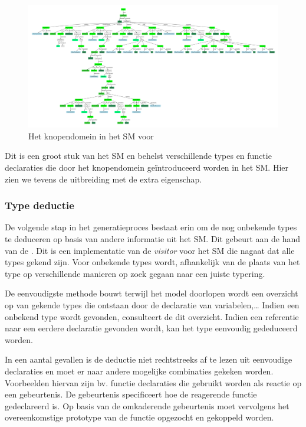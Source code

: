 \begin{figure}[H]
  \centering
  \includegraphics[angle=90,width=0.7\linewidth]{resources/nodes_sm.pdf}
  \caption{Het knopendomein in het SM voor  }
  \label{fig:nodes.sm}
\end{figure}

Dit is een groot stuk van het SM en behelst verschillende types en functie
declaraties die door het knopendomein ge\"introduceerd worden in het SM. Hier
zien we tevens de uitbreiding met de extra  eigenschap.

\subsubsection{Type deductie}

De volgende stap in het generatieproces bestaat erin om de nog onbekende types
te deduceren op basis van andere informatie uit het SM. Dit gebeurt aan de hand
van de . Dit is een implementatie van de \emph{visitor}
voor het SM die nagaat dat alle types gekend zijn. Voor onbekende types wordt,
afhankelijk van de plaats van het type op verschillende manieren op zoek gegaan
naar een juiste typering.

De eenvoudigste methode bouwt terwijl het model doorlopen wordt een overzicht
op van gekende types die ontstaan door de declaratie van variabelen,\dots
Indien een onbekend type wordt gevonden, consulteert de 
dit overzicht. Indien een referentie naar een eerdere declaratie gevonden
wordt, kan het type eenvoudig gededuceerd worden.

In een aantal gevallen is de deductie niet rechtstreeks af te lezen uit
eenvoudige declaraties en moet er naar andere mogelijke combinaties gekeken
worden. Voorbeelden hiervan zijn bv. functie declaraties die gebruikt worden
als reactie op een gebeurtenis. De gebeurtenis specificeert hoe de reagerende
functie gedeclareerd is. Op basis van de omkaderende gebeurtenis moet
vervolgens het overeenkomstige prototype van de functie opgezocht en gekoppeld
worden.

